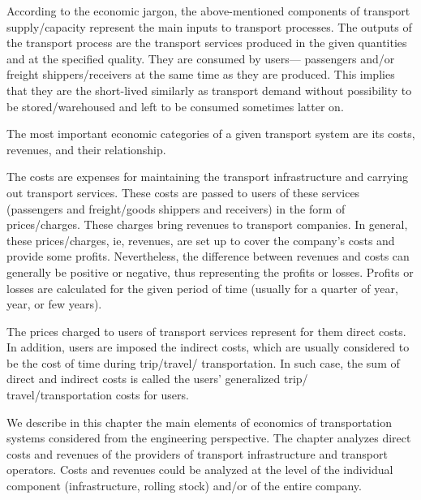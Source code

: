 \par
According to the economic jargon, the above-mentioned components of transport supply/capacity represent the main inputs to transport processes. The outputs of the transport process are the transport services produced in the given quantities and at the specified quality. They are consumed by users— passengers and/or freight shippers/receivers at the same time as they are produced. This implies that they are the short-lived similarly as transport demand without possibility to be stored/warehoused and left to be consumed sometimes latter on.\\
\par
The most important economic categories of a given transport system are its costs, revenues, and their relationship.\\
\par
The costs are expenses for maintaining the transport infrastructure and carrying out transport
services. These costs are passed to users of these services (passengers and freight/goods shippers and receivers) in the form of prices/charges. These charges bring revenues to transport companies. In general, these prices/charges, ie, revenues, are set up to cover the company’s costs and provide some profits. Nevertheless, the difference between revenues and costs can generally be positive or negative, thus representing the profits or losses. Profits or losses are calculated for the given period of time (usually for a quarter of year, year, or few years).\\
\par
The prices charged to users of transport services represent for them direct costs. In addition, users are imposed the indirect costs, which are usually considered to be the cost of time during trip/travel/ transportation. In such case, the sum of direct and indirect costs is called the users’ generalized trip/ travel/transportation costs for users.\\
\par
We describe in this chapter the main elements of economics of transportation systems considered
from the engineering perspective. The chapter analyzes direct costs and revenues of the providers of transport infrastructure and transport operators. Costs and revenues could be analyzed at the level of the individual component (infrastructure, rolling stock) and/or of the entire company.
%
